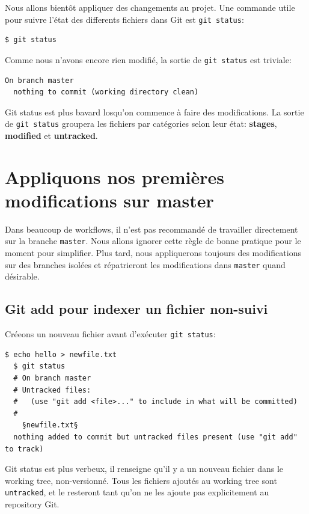 \documentclass{../../common/tufte-latex/tufte-handout}
\begin{document}
Nous allons bientôt appliquer des changements au projet.
Une commande utile pour suivre l'état des differents fichiers dans Git est \texttt{git status}:

\begin{lstlisting}[style=BashInputStyle]
  $ git status
\end{lstlisting}

Comme nous n'avons encore rien modifié, la sortie de \texttt{git status} est triviale:

\begin{lstlisting}[style=BashInputStyle]
  On branch master
  nothing to commit (working directory clean)
\end{lstlisting}

Git status est plus bavard losqu'on commence à faire des modifications.
La sortie de \texttt{git status} groupera les fichiers par catégories selon leur état: \textbf{stages}, \textbf{modified} et \textbf{untracked}.

\section{Appliquons nos premières modifications sur master}

Dans beaucoup de workflows, il n'est pas recommandé de travailler directement sur la branche \texttt{master}.
Nous allons ignorer cette règle de bonne pratique pour le moment pour simplifier.
Plus tard, nous appliquerons toujours des modifications sur des branches isolées et répatrieront les modifications dans \texttt{master} quand désirable.

\subsection{Git add pour indexer un fichier non-suivi}

Créeons un nouveau fichier avant d'exécuter \texttt{git status}:

\begin{lstlisting}[style=BashInputStyle]
  $ echo hello > newfile.txt
  $ git status
  # On branch master
  # Untracked files:
  #   (use "git add <file>..." to include in what will be committed)
  #
    §newfile.txt§
  nothing added to commit but untracked files present (use "git add" to track)
\end{lstlisting}

Git status est plus verbeux, il renseigne qu'il y a un nouveau fichier dans le working tree, non-versionné.
Tous les fichiers ajoutés au working tree sont \texttt{untracked}, et le resteront tant qu'on ne les ajoute pas explicitement au repository Git.
\end{document}
